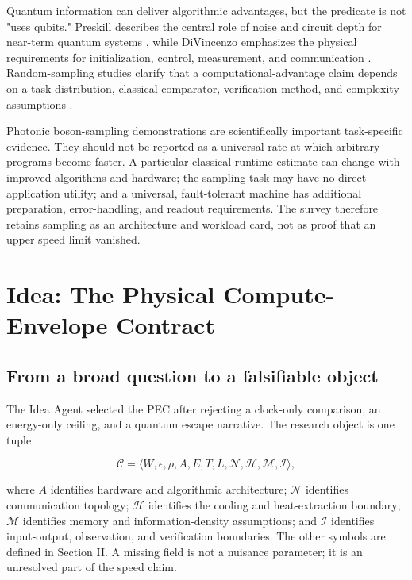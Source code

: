 \documentclass[conference]{IEEEtran}
\newcommand{\pec}{\textsc{PEC}}
\begin{document}
Quantum information can deliver algorithmic advantages, but the predicate is
not "uses qubits." Preskill describes the central role of noise and circuit
depth for near-term quantum systems \cite{preskill}, while DiVincenzo
emphasizes the physical requirements for initialization, control,
measurement, and communication \cite{divincenzo}. Random-sampling studies
clarify that a computational-advantage claim depends on a task distribution,
classical comparator, verification method, and complexity assumptions
\cite{hangleiter}.

Photonic boson-sampling demonstrations are scientifically important
task-specific evidence. They should not be reported as a universal rate at
which arbitrary programs become faster. A particular classical-runtime
estimate can change with improved algorithms and hardware; the sampling task
may have no direct application utility; and a universal, fault-tolerant
machine has additional preparation, error-handling, and readout requirements.
The survey therefore retains sampling as an architecture and workload card,
not as proof that an upper speed limit vanished.

\section{Idea: The Physical Compute-Envelope Contract}

\subsection{From a broad question to a falsifiable object}

The Idea Agent selected the \pec{} after rejecting a clock-only comparison,
an energy-only ceiling, and a quantum escape narrative. The research object is
one tuple

\begin{equation}
\mathcal{C}=\langle W,\epsilon,\rho,A,E,T,L,\mathcal{N},
\mathcal{H},\mathcal{M},\mathcal{I}\rangle,
\label{eq:contract}
\end{equation}

where \(A\) identifies hardware and algorithmic architecture;
\(\mathcal{N}\) identifies communication topology; \(\mathcal{H}\) identifies
the cooling and heat-extraction boundary; \(\mathcal{M}\) identifies memory
and information-density assumptions; and \(\mathcal{I}\) identifies
input-output, observation, and verification boundaries. The other symbols are
defined in Section II. A missing field is not a nuisance parameter; it is an
unresolved part of the speed claim.
\end{document}
